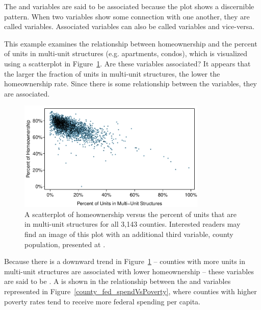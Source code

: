 The  and  variables are said to be associated because the plot shows a discernible pattern. When two variables show some connection with one another, they are called  variables. Associated variables can also be called  variables and vice-versa.

\begin{example}{This example examines the relationship between homeownership and the percent of units in multi-unit structures (e.g. apartments, condos), which is visualized using a scatterplot in Figure~\ref{multiunitsVsOwnership}. Are these variables associated?}
It appears that the larger the fraction of units in multi-unit structures, the lower the homeownership rate. Since there is some relationship between the variables, they are associated.
\end{example}


\begin{figure}
   \centering
   \includegraphics[width=0.8\textwidth]{ch_intro_to_data/figures/multiunitsVsOwnership/multiunitsVsOwnership}
   \caption{A scatterplot of homeownership versus the percent of units that are in multi-unit structures for all 3,143 counties. Interested readers may find an image of this plot with an additional third variable, county population, presented at .}
   \label{multiunitsVsOwnership}
\end{figure}

Because there is a downward trend in Figure~\ref{multiunitsVsOwnership} -- counties with more units in multi-unit structures are associated with lower homeownership -- these variables are said to be . A  is shown in the relationship between the  and  variables represented in Figure~\ref{county_fed_spendVsPoverty}, where counties with higher poverty rates tend to receive more federal spending per capita.

